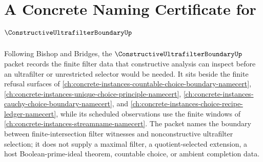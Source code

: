 \chapter{A Concrete Naming Certificate for $\ConstructiveUltrafilterBoundaryUp$}
\label{ch:concrete-instances-constructive-ultrafilter-boundary-namecert}

Following Bishop and Bridges, the $\ConstructiveUltrafilterBoundaryUp$ packet records the finite filter data that constructive analysis can inspect before an ultrafilter or unrestricted selector would be needed. It sits beside the finite refusal surfaces of \autoref{ch:concrete-instances-countable-choice-boundary-namecert}, \autoref{ch:concrete-instances-unique-choice-principle-namecert}, \autoref{ch:concrete-instances-cauchy-choice-boundary-namecert}, and \autoref{ch:concrete-instances-choice-recipe-ledger-namecert}, while its scheduled observations use the finite windows of \autoref{ch:concrete-instances-streamname-namecert}. The packet names the boundary between finite-intersection filter witnesses and nonconstructive ultrafilter selection; it does not supply a maximal filter, a quotient-selected extension, a host Boolean-prime-ideal theorem, countable choice, or ambient completion data.

